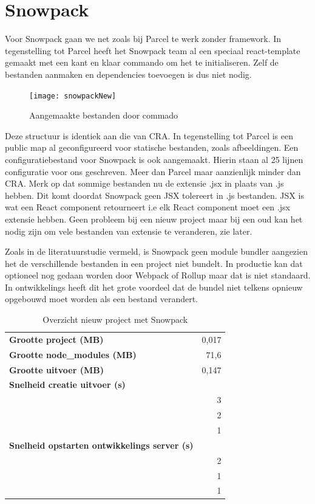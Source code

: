 \section{Snowpack}
Voor Snowpack gaan we net zoals bij Parcel te werk zonder framework. In tegenstelling tot Parcel heeft het Snowpack team al een speciaal react-template gemaakt met een kant en klaar commando om het te initialiseren. Zelf de bestanden aanmaken en dependencies toevoegen is dus niet nodig.


\begin{figure}[h]
   \texttt{[image: snowpackNew]}
       \centering
       \caption[Aangemaakte bestanden door Snowpack commando]{Aangemaakte bestanden door commado}
   \end{figure}

Deze structuur is identiek aan die van CRA. In tegenstelling tot Parcel is een public map al geconfigureerd voor statische bestanden, zoals afbeeldingen. Een configuratiebestand voor Snowpack is ook aangemaakt. Hierin staan al 25 lijnen configuratie voor ons geschreven. Meer dan Parcel maar aanzienlijk minder dan CRA. Merk op dat sommige bestanden nu de extensie .jsx in plaats van .js hebben. Dit komt doordat Snowpack geen JSX tolereert in .js bestanden. JSX is wat een React component retourneert i.e elk React component moet een .jsx extensie hebben. Geen probleem bij een nieuw project maar bij een oud kan het nodig zijn om vele bestanden van extensie te veranderen, zie later.

Zoals in de literatuurstudie vermeld, is Snowpack geen module bundler aangezien het de verschillende bestanden in een project niet bundelt. In productie kan dat optioneel nog gedaan worden door Webpack of Rollup maar dat is niet standaard. In ontwikkelings heeft dit het grote voordeel dat de bundel niet telkens opnieuw opgebouwd moet worden als een bestand verandert.

\begin{table}[h]
   \centering
   \begin{tabular}{lr}
   \textbf{Grootte project (MB)} & 0,017 \\
   \textbf{Grootte node\_modules (MB)} & 71,6 \\
   \textbf{Grootte uitvoer (MB)} & 0,147 \\
   \textbf{Snelheid creatie uitvoer (s)} &  \\
   \textbf{} & 3 \\
   \textbf{} & 2 \\
   \textbf{} & 1 \\
   \textbf{Snelheid opstarten ontwikkelings server (s)} &  \\
   \textbf{} & 2 \\
   \textbf{} & 1 \\
   \textbf{} & 1
   \end{tabular}
   \caption{Overzicht nieuw project met Snowpack}
   \end{table}

